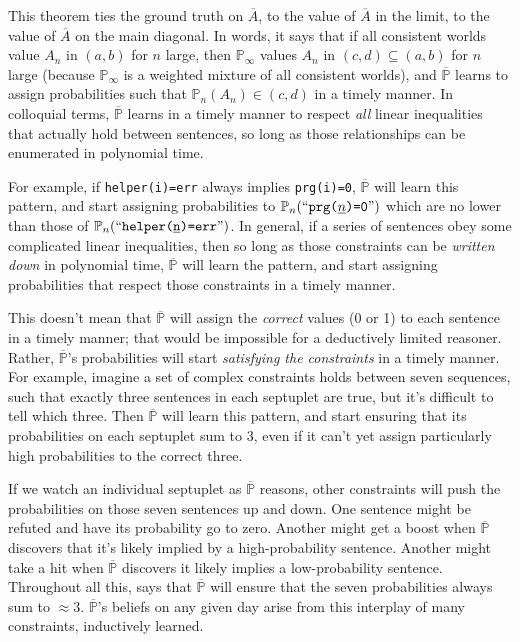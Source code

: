 \documentclass[authordate,onecolumn,noenvironments]{miri-tech-article}
\numberwithin{equation}{subsection}
\newcommand{\quot}[1]{``#1"}
\newcommand{\enc}[1]{{\underline{#1}}}
\newcommand{\seq}[1]{{\overline{#1}}}
\newcommand{\nn}{n}
\newcommand{\aff}{A}
\newcommand{\BelState}{\mathbb{P}}
\newcommand{\pt}{\BelState}
\newcommand{\MP}{\seq{\pt}}
\begin{document}
\noindent This theorem ties the ground truth on $\seq{\aff}$, to the value of $\seq{\aff}$ in the limit, to the value of $\seq{\aff}$ on the main diagonal. In words, it says that if all consistent worlds value $\aff_\nn$ in $(a, b)$ for $\nn$ large, then $\pt_\infty$ values $\aff_\nn$ in $(c, d) \subseteq (a, b)$ for $n$ large (because $\pt_\infty$ is a weighted mixture of all consistent worlds), and $\MP$ learns to assign probabilities such that $\pt_\nn(\aff_\nn)\in (c, d)$ in a timely manner. In colloquial terms, $\MP$ learns in a timely manner to respect \emph{all} linear inequalities that actually hold between sentences, so long as those relationships can be enumerated in polynomial time.

For example, if \texttt{helper(i)=err} always implies \texttt{prg(i)=0}, $\MP$ will learn this pattern, and start assigning probabilities to $\pt_\nn(\quot{\text{\texttt{prg(\enc{$\nn$})=0}}})$ which are no lower than those of $\pt_\nn(\quot{\text{\texttt{helper(\enc{n})=err}}})$. In general, if a series of sentences obey some complicated linear inequalities, then so long as those constraints can be \emph{written down} in polynomial time, $\MP$ will learn the pattern, and start assigning probabilities that respect those constraints in a timely manner.

This doesn't mean that $\MP$ will assign the \emph{correct} values (0 or 1) to each sentence in a timely manner; that would be impossible for a deductively limited reasoner. Rather, $\MP$'s probabilities will start \emph{satisfying the constraints} in a timely manner. For example, imagine a set of complex constraints holds between seven sequences, such that exactly three sentences in each septuplet are true, but it's difficult to tell which three. Then $\MP$ will learn this pattern, and start ensuring that its probabilities on each septuplet sum to 3, even if it can't yet assign particularly high probabilities to the correct three.

If we watch an individual septuplet as $\MP$ reasons, other constraints will push the probabilities on those seven sentences up and down. One sentence might be refuted and have its probability go to zero. Another might get a boost when $\MP$ discovers that it's likely implied by a high-probability sentence. Another might take a hit when $\MP$ discovers it likely implies a low-probability sentence. Throughout all this,  says that $\MP$ will ensure that the seven probabilities always sum to $\approx 3$. $\MP$'s beliefs on any given day arise from this interplay of many constraints, inductively learned.
\end{document}
